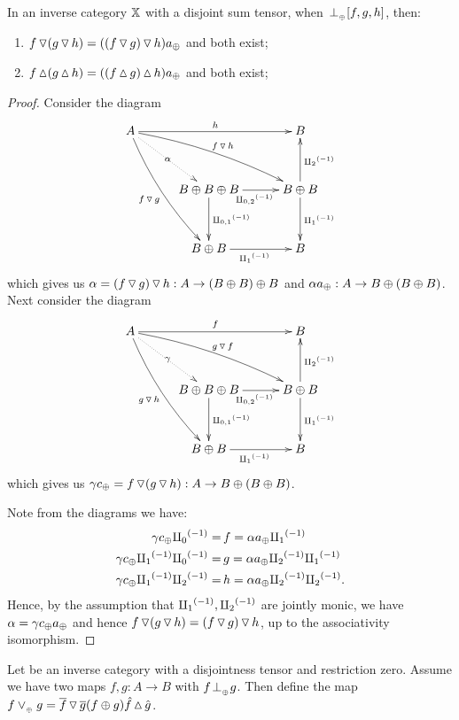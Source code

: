 \begin{lemma}\label{lem:tjleft_and_tjright_associate}
  In an inverse category $\mathbb{X}$ with a disjoint sum tensor, when ${}_{{}_{}}{\perp_{{}_{\oplus}}} [f,g,h]$, then:
  \begin{enumerate}
    \item   $f \operatorname{\triangledown} (g \operatorname{\triangledown} h) = ((f \operatorname{\triangledown} g) \operatorname{\triangledown} h) a_{\oplus}$ and both exist;
    \item   $f \operatorname{\vartriangle} (g \operatorname{\vartriangle} h) = ((f \operatorname{\vartriangle} g) \operatorname{\vartriangle} h) a_{\oplus}$ and both exist;
  \end{enumerate}
\end{lemma}
\begin{proof}
  Consider the diagram
  \[
    \xymatrix@C+5pt@R+10pt{
      A \ar@/_/[ddr]_{f\tjleft g} \ar@/^/[drr]^{f\tjleft h} \ar@{.>}[dr]|-{\alpha} \ar[rr]^{h}
        & & B \\
        & B\+B\+B \ar[d]^{\icp{0,1}} \ar[r]_{\icp{0,2}} & B\+B \ar[d]^{\icpa} \ar[u]_{\icpb} \\
        & B\+B \ar[r]_{\icpa} & B
    }
  \]
  which gives us $\alpha = (f \operatorname{\triangledown} g) \operatorname{\triangledown} h: A \to (B\oplus B)\oplus B$ and
  $\alpha a_{\oplus} :A \to B\oplus(B\oplus B)$. Next consider the diagram
  \[
    \xymatrix@C+5pt@R+10pt{
      A \ar@/_/[ddr]_{g\tjleft h} \ar@/^/[drr]^{g\tjleft f} \ar@{.>}[dr]|-{\gamma} \ar[rr]^{f}
        & & B \\
        & B\+B\+B \ar[d]^{\icp{0,1}} \ar[r]_{\icp{0,2}} & B\+B \ar[d]^{\icpa} \ar[u]_{\icpb} \\
        & B\+B \ar[r]_{\icpa} & B
    }
  \]
  which gives us $\gamma c_{\oplus} = f \operatorname{\triangledown} (g\operatorname{\triangledown} h): A \to B\oplus(B\oplus B)$.

  Note from the diagrams we have:
  \begin{align*}
    \gamma c_{\oplus}  {\amalg_{0}}^{(-1)}         =\, &f  = \alpha a_{\oplus}{\amalg_{1}}^{(-1)}\\
    \gamma c_{\oplus}  {\amalg_{1}}^{(-1)} {\amalg_{0}}^{(-1)} =\, &g  = \alpha a_{\oplus}{\amalg_{2}}^{(-1)}{\amalg_{1}}^{(-1)}\\
    \gamma c_{\oplus}  {\amalg_{1}}^{(-1)} {\amalg_{2}}^{(-1)}   =\, & h = \alpha a_{\oplus}{\amalg_{2}}^{(-1)}{\amalg_{2}}^{(-1)}.
  \end{align*}
  Hence, by the assumption that ${\amalg_{1}}^{(-1)}, {\amalg_{2}}^{(-1)}$ are jointly monic, we have
  $\alpha = \gamma c_{\oplus}  a_{\oplus}$ and hence $f \operatorname{\triangledown} (g \operatorname{\triangledown} h) = (f \operatorname{\triangledown} g) \operatorname{\triangledown} h$,
  up to the associativity isomorphism.
\end{proof}
\begin{definition}\label{def:tensor_disjoint_join}
  Let \X be an inverse category with a disjointness tensor and restriction zero. Assume we have two
  maps $f,g: A \to B$ with $f{}_{{}_{}}{\perp_{{}_{\oplus}}} g$. Then define the map $f \vee_{{_{\oplus}}} g = \overline{f}\operatorname{\triangledown}\overline{g}
  (f\oplus g) \hat{f}\operatorname{\vartriangle}\hat{g}$.
\end{definition}


